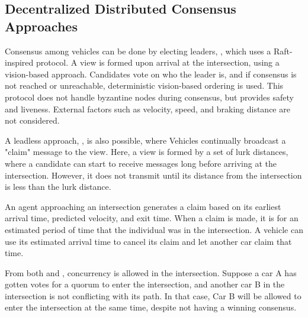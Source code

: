 \documentclass[fleqn,10pt]{olplainarticle}
\begin{document}
\subsection{Decentralized Distributed Consensus Approaches}



Consensus among vehicles can be done by electing leaders, \cite{lee2025distributedconsensusalgorithmprioritizing}, which uses a Raft-inspired protocol. A view is formed upon arrival at the intersection, using a vision-based approach. 
Candidates vote on who the leader is, and if consensus is not reached or unreachable, deterministic vision-based ordering is used. This protocol does not handle byzantine nodes during consensus, but provides safety and liveness. External factors such as velocity, speed, and braking distance are not considered. 


A leadless approach, \cite{inproceedings}, is also possible, where Vehicles continually broadcast a "claim" message to the view. Here, a view is formed by a set of lurk distances, where a candidate can start to receive messages long before arriving at the intersection. However, it does not transmit until its distance from the intersection is less than the lurk distance.  

An agent approaching an intersection generates a claim based on its earliest arrival time, predicted velocity, and exit time. When a claim is made, it is for an estimated period of time that the individual was in the intersection. 
A vehicle can use its estimated arrival time to cancel its claim and let another car claim that time. 

From both \cite{inproceedings} and \cite{lee2025distributedconsensusalgorithmprioritizing}, concurrency is allowed in the intersection. Suppose a car A has gotten votes for a quorum to enter the intersection, and another car B in the intersection is not conflicting with its path. In that case, Car B will be allowed to enter the intersection at the same time, despite not having a winning consensus. 







\end{document}
